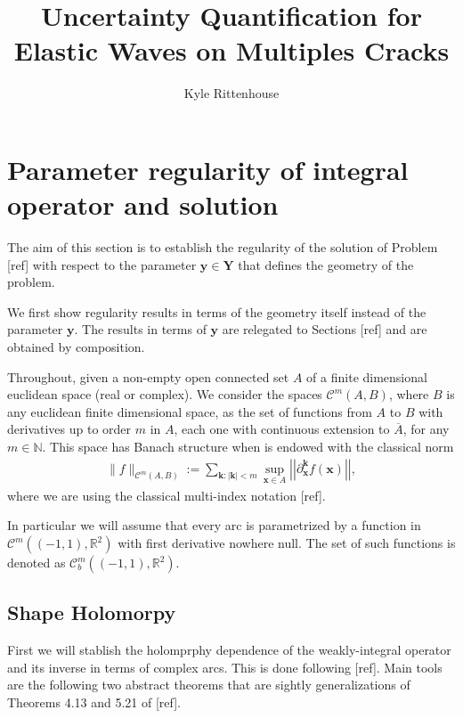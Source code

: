 \documentclass{article}
\title{Uncertainty Quantification for Elastic Waves on Multiples Cracks}
\author{Kyle Rittenhouse}
\newcommand{\todo}[1]{{\color{red}[#1]}}
\newcommand{\IN}{{\mathbb N}}
\newcommand{\IR}{{\mathbb R}}
\newcommand{\cmspace}[3]{\mathcal{C}^{#1} \left( #2, #3 \right)}
\newcommand{\rgeo}[1]{\mathcal{C}_b^{#1}\left( (-1,1), \IR^2 \right)}
\newcommand{\bk}{\bm{k}}
\newcommand{\bx}{\bm{x}}
\newcommand{\by}{\bm{y}}
\begin{document}
\maketitle

\section{Parameter regularity of  integral operator and solution}

The aim of this section is to establish the regularity of the solution of Problem \todo{ref} with respect to the  parameter $\by \in \mathbf{Y}$ that defines the geometry of the problem.  

We first show regularity results in terms of the geometry itself instead of the parameter $\by$. The results in terms of $\by$ are relegated to Sections \todo{ref} and are obtained by composition. 

Throughout, given a non-empty open connected set $A$ of a finite dimensional euclidean space (real or complex). We consider the spaces $\cmspace{m}{A}{B}$, where $B$ is any euclidean finite dimensional space, as the set of functions from $A$ to $B$ with derivatives up to order $m$ in $A$, each one with continuous extension to $\overline{A}$, for any $m \in \IN$. This space has Banach structure when is endowed with the classical norm 
\begin{align*}
\| f \|_{\cmspace{m}{A}{B}} := \sum_{\bk: |\bk| < m } \sup_{\bx \in A}  \left\vert\left\vert\partial_{\bx}^{\bk} f(\bx) \right\vert\right\vert,
\end{align*}
where we are using the classical multi-index notation \todo{ref}. 

In particular we will assume that every arc is parametrized by a function in $\cmspace{m}{(-1,1)}{\IR^2}$  with first derivative nowhere null. The set of such functions is denoted as $\rgeo{m}$. 

\subsection{Shape Holomorpy}

First we will stablish the holomprphy dependence of the weakly-integral operator and its inverse in terms of complex arcs. This is done following \todo{ref}. Main tools are the following two abstract theorems that are sightly generalizations of Theorems 4.13 and 5.21 of \todo{ref}.
\end{document}
